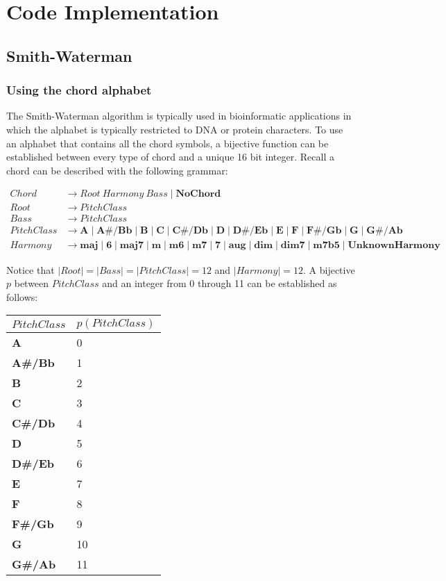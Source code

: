 \chapter{Code Implementation}

\section{Smith-Waterman}

\subsection{Using the chord alphabet}

The Smith-Waterman algorithm is typically used in bioinformatic applications in which the alphabet is typically restricted to DNA or protein characters. To use an alphabet that contains all the chord symbols, a bijective function can be established between every type of chord and a unique 16 bit integer. Recall a chord can be described with the following grammar:

\begin{align*}
Chord &\to Root\ Harmony \ Bass \mid \textbf{NoChord} \\
Root &\to PitchClass \\
Bass &\to PitchClass \\
PitchClass &\to \textbf{A} \mid \textbf{A#/Bb} \mid \textbf{B} \mid \textbf{C} \mid \textbf{C#/Db} \mid \textbf{D} \mid \textbf{D#/Eb} \mid \textbf{E} \mid \textbf{F} \mid \textbf{F#/Gb} \mid \textbf{G} \mid \textbf{G#/Ab} \\
Harmony &\to \textbf{maj} \mid \textbf{6} \mid \textbf{maj7} \mid \textbf{m} \mid \textbf{m6} \mid \textbf{m7} \mid \textbf{7} \mid \textbf{aug} \mid \textbf{dim} \mid \textbf{dim7} \mid \textbf{m7b5} \mid \textbf{UnknownHarmony}
\end{align*}

Notice that $|Root| = |Bass| = |PitchClass| = 12$ and $|Harmony| = 12$. A bijective $p$ between $PitchClass$ and an integer from 0 through 11 can be established as follows:

\begin{tabular}{ll}
\toprule
$PitchClass$ & $p(PitchClass)$ \\
\midrule
\textbf{A} & 0 \\
\textbf{A#/Bb} & 1 \\
\textbf{B} & 2 \\
\textbf{C} & 3 \\
\textbf{C#/Db} & 4 \\
\textbf{D} & 5 \\
\textbf{D#/Eb} & 6 \\
\textbf{E} & 7 \\
\textbf{F} & 8 \\
\textbf{F#/Gb} & 9 \\
\textbf{G} & 10 \\
\textbf{G#/Ab} & 11 \\
\bottomrule
\end{tabular}


